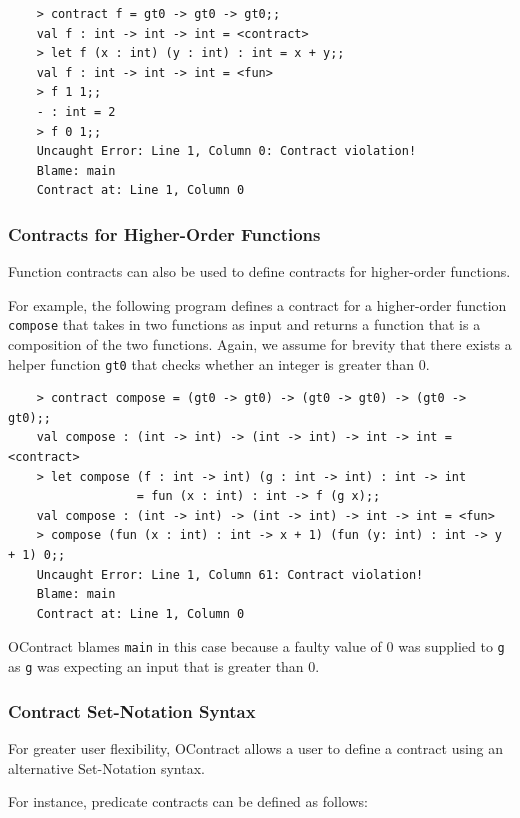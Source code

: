 \documentclass[a4paper]{article}
\begin{document}
\begin{verbatim}
    > contract f = gt0 -> gt0 -> gt0;;
    val f : int -> int -> int = <contract>
    > let f (x : int) (y : int) : int = x + y;;
    val f : int -> int -> int = <fun>
    > f 1 1;;
    - : int = 2
    > f 0 1;;
    Uncaught Error: Line 1, Column 0: Contract violation!
    Blame: main
    Contract at: Line 1, Column 0
\end{verbatim}

\subsubsection{Contracts for Higher-Order Functions}

Function contracts can also be used to define contracts for higher-order functions.

For example, the following program defines a contract for a higher-order function \texttt{compose} that takes in two functions as input and returns a function that is a composition of the two functions.
Again, we assume for brevity that there exists a helper function \texttt{gt0} that checks whether an integer is greater than 0.

\begin{verbatim}
    > contract compose = (gt0 -> gt0) -> (gt0 -> gt0) -> (gt0 -> gt0);;
    val compose : (int -> int) -> (int -> int) -> int -> int = <contract>
    > let compose (f : int -> int) (g : int -> int) : int -> int
                  = fun (x : int) : int -> f (g x);;
    val compose : (int -> int) -> (int -> int) -> int -> int = <fun>
    > compose (fun (x : int) : int -> x + 1) (fun (y: int) : int -> y + 1) 0;;
    Uncaught Error: Line 1, Column 61: Contract violation!
    Blame: main
    Contract at: Line 1, Column 0
\end{verbatim}

OContract blames \texttt{main} in this case because a faulty value of 0 was supplied to \texttt{g} as \texttt{g} was expecting an input that is greater than 0.

\subsubsection{Contract Set-Notation Syntax}

For greater user flexibility, OContract allows a user to define a contract using an alternative Set-Notation syntax.

For instance, predicate contracts can be defined as follows:
\end{document}
